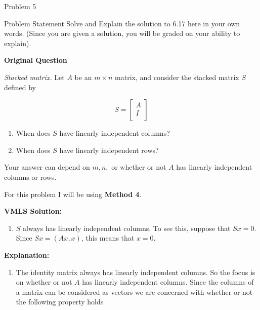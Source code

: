 \begin{problem}{Problem 5}
    \begin{statement}{Problem Statement}
        Solve and Explain the solution to 6.17 here in your own words. (Since you are given a solution, you will be graded on your ability to explain). \vspace*{1em}

        \noindent \textbf{Original Question} \vspace*{1em}

        \textit{Stacked matrix.} Let $A$ be an $m \times n$ matrix, and consider the stacked matrix $S$ defined by

        \begin{equation*}
            S =
            \begin{bmatrix}
                A \\
                I \\
            \end{bmatrix}
        \end{equation*}

        \begin{enumerate}[label = (\alph*)]
            \item When does $S$ have linearly independent columns?
            \item When does $S$ have linearly independent rows?
        \end{enumerate}
        Your answer can depend on $m, n,$ or whether or not $A$ has linearly independent columns or rows.
    \end{statement}

    \begin{Highlight}
        For this problem I will be using \textbf{Method 4}. \vspace*{1em}

        \noindent \textbf{VMLS Solution:}

        \begin{enumerate}[label = (\alph*)]
            \item $S$ always has linearly independent columns. To see this, suppose that $Sx = 0$. Since $Sx = (Ax,x)$, this means that $x = 0$.
        \end{enumerate}

        \noindent \textbf{Explanation:}

        \begin{enumerate}[label = (\alph*)]
            \item The identity matrix always has linearly independent columns. So the focus is on whether or not $A$ has linearly independent columns. Since the columns of a matrix can be considered as vectors
            we are concerned with whether or not the following property holds
    

\end{enumerate}
\end{Highlight}
\end{problem}
